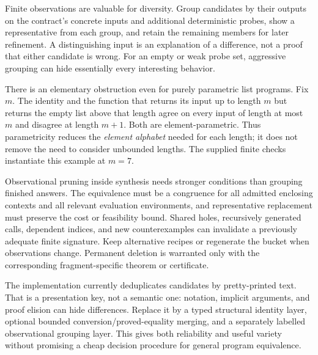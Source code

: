 Finite observations are valuable for diversity. Group candidates by their outputs on the contract's concrete inputs and additional deterministic probes, show a representative from each group, and retain the remaining members for later refinement. A distinguishing input is an explanation of a difference, not a proof that either candidate is wrong. For an empty or weak probe set, aggressive grouping can hide essentially every interesting behavior.

There is an elementary obstruction even for purely parametric list programs. Fix $m$. The identity and the function that returns its input up to length $m$ but returns the empty list above that length agree on every input of length at most $m$ and disagree at length $m+1$. Both are element-parametric. Thus parametricity reduces the \emph{element alphabet} needed for each length; it does not remove the need to consider unbounded lengths. The supplied finite checks instantiate this example at $m=7$.

Observational pruning inside synthesis needs stronger conditions than grouping finished answers. The equivalence must be a congruence for all admitted enclosing contexts and all relevant evaluation environments, and representative replacement must preserve the cost or feasibility bound. Shared holes, recursively generated calls, dependent indices, and new counterexamples can invalidate a previously adequate finite signature. Keep alternative recipes or regenerate the bucket when observations change. Permanent deletion is warranted only with the corresponding fragment-specific theorem or certificate.

The implementation currently deduplicates candidates by pretty-printed text. That is a presentation key, not a semantic one: notation, implicit arguments, and proof elision can hide differences. Replace it by a typed structural identity layer, optional bounded conversion/proved-equality merging, and a separately labelled observational grouping layer.\cite{implementation} This gives both reliability and useful variety without promising a cheap decision procedure for general program equivalence.
